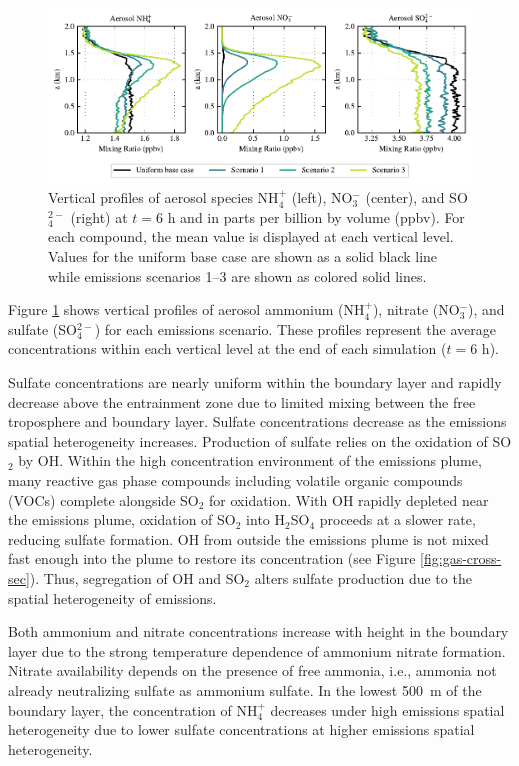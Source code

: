 \documentclass[journal abbreviation, manuscript]{copernicus}
\begin{document}
\begin{figure}[!h]
	\centering
	\includegraphics[]{figures/aerosol-SNA-vertical-profiles-time36.pdf}
	\caption{Vertical profiles of aerosol species NH$_4^+$ (left),
          NO$_3^-$ (center), and SO$_4^{2-}$ (right) at $t=6$ h and in
          parts per billion by volume (ppbv). For each compound, the
          mean value is displayed at each vertical level. Values for
          the uniform base case are shown as a solid black line while
          emissions scenarios 1--3 are shown as colored solid lines.}
	\label{fig:vertical-profile-SNA}
\end{figure} 

Figure \ref{fig:vertical-profile-SNA} shows vertical profiles of
aerosol ammonium (NH$_4^+$), nitrate (NO$_3^-$), and sulfate
(SO$_4^{2-}$) for each emissions scenario. These profiles represent
the average concentrations within each vertical level at the end of
each simulation ($t=6$ h).

Sulfate concentrations are nearly uniform within the boundary layer
and rapidly decrease above the entrainment zone due to limited mixing
between the free troposphere and boundary layer. Sulfate
concentrations decrease as the emissions spatial heterogeneity
increases. Production of sulfate relies on the oxidation of SO$_2$ by
OH. Within the high concentration environment of the emissions plume,
many reactive gas phase compounds including volatile organic compounds
(VOCs) complete alongside SO$_2$ for oxidation. With OH rapidly
depleted near the emissions plume, oxidation of SO$_2$ into
H$_2$SO$_4$ proceeds at a slower rate, reducing sulfate formation. OH
from outside the emissions plume is not mixed fast enough into the
plume to restore its concentration (see Figure
\ref{fig:gas-cross-sec}). Thus, segregation of OH and SO$_2$ alters
sulfate production due to the spatial heterogeneity of emissions.

Both ammonium and nitrate concentrations increase with height in the
boundary layer due to the strong temperature dependence of ammonium
nitrate formation. Nitrate availability depends on the presence of
free ammonia, i.e., ammonia not already neutralizing
sulfate as ammonium sulfate. In the lowest 500~m of the boundary
layer, the concentration of NH$_4^+$ decreases under high emissions
spatial heterogeneity due to lower
sulfate concentrations at higher emissions spatial
heterogeneity.  
\end{document}
